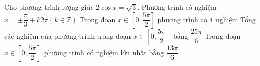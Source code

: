 \begin{ex}%
	Cho phương trình lượng giác $2 \cos  x=\sqrt{3}$.
	 \choiceTF
		{Phương trình có nghiệm $x=\pm \dfrac{\pi}{3}+k2\pi (k\in  \mathbb{Z})$}
		{Trong đoạn $x \in\left[0; \dfrac{5 \pi}{2}\right]$ phương trình có  $4$ nghiệm}
		{\True Tổng các nghiệm của phương trình trong đoạn $x \in\left[0; \dfrac{5 \pi}{2}\right]$ bằng $\dfrac{25\pi}{6}$} 
		{\True Trong đoạn $x  \in\left[0; \dfrac{5 \pi}{2}\right]$ phương trình có nghiệm lớn nhất bằng $\dfrac{13\pi}{6}$}
\end{ex}

